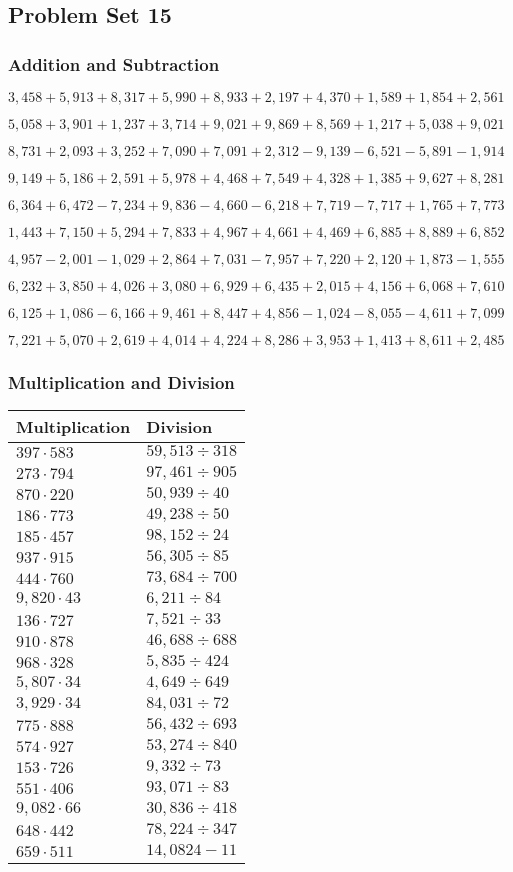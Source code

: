 \hypertarget{problem-set-15-3}{%
\subsection{Problem Set 15}\label{problem-set-15-3}}

\hypertarget{addition-and-subtraction-177}{%
\subsubsection{Addition and
Subtraction}\label{addition-and-subtraction-177}}

\(3,458+5,913+8,317+5,990+8,933+2,197+4,370+1,589+1,854+ 2,561\)

\(5,058+3,901+1,237+3,714+9,021+9,869+8,569+1,217+5,038+9,021\)

\(8,731+2,093+3,252+7,090+7,091+2,312-9,139-6,521-5,891-1,914\)

\(9,149+5,186+2,591+5,978+4,468+7,549+4,328+1,385+9,627+8,281\)

\(6,364+6,472-7,234+9,836-4,660-6,218+7,719-7,717+1,765+7,773\)

\(1,443+7,150+5,294+7,833+4,967+4,661+4,469+6,885+8,889+6,852\)

\(4,957-2,001-1,029+2,864+7,031-7,957+7,220+2,120+1,873-1,555\)

\(6,232+3,850+4,026+3,080+6,929+6,435+2,015+4,156+6,068+7,610\)

\(6,125+1,086-6,166+9,461+8,447+4,856-1,024-8,055-4,611+7,099\)

\(7,221+5,070+2,619+4,014+4,224+8,286+3,953+1,413+8,611+2,485\)

\hypertarget{multiplication-and-division-176}{%
\subsubsection{Multiplication and
Division}\label{multiplication-and-division-176}}

\begin{longtable}[]{@{}ll@{}}
\toprule
Multiplication & Division\tabularnewline
\midrule
\endhead
\(397\cdot583\) & \(59,513÷318\)\tabularnewline
\(273\cdot794\) & \(97,461÷905\)\tabularnewline
\(870\cdot220\) & \(50,939÷40\)\tabularnewline
\(186\cdot773\) & \(49,238÷50\)\tabularnewline
\(185\cdot457\) & \(98,152÷24\)\tabularnewline
\(937\cdot915\) & \(56,305÷85\)\tabularnewline
\(444\cdot760\) & \(73,684÷700\)\tabularnewline
\(9,820\cdot43\) & \(6,211÷ 84\)\tabularnewline
\(136\cdot727\) & \(7,521÷33\)\tabularnewline
\(910\cdot878\) & \(46,688÷688\)\tabularnewline
\(968\cdot328\) & \(5,835÷424\)\tabularnewline
\(5,807\cdot34\) & \(4,649÷649\)\tabularnewline
\(3,929\cdot34\) & \(84,031÷72\)\tabularnewline
\(775\cdot888\) & \(56,432÷693\)\tabularnewline
\(574\cdot927\) & \(53,274÷840\)\tabularnewline
\(153\cdot726\) & \(9,332÷73\)\tabularnewline
\(551\cdot406\) & \(93,071÷83\)\tabularnewline
\(9,082\cdot66\) & \(30,836÷418\)\tabularnewline
\(648\cdot442\) & \(78,224÷347\)\tabularnewline
\(659\cdot511\) & \(14,082 4-11\)\tabularnewline
\bottomrule
\end{longtable}

